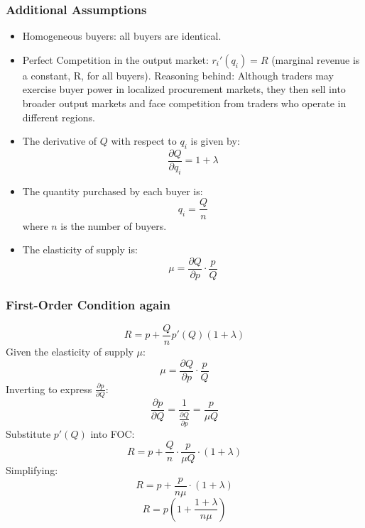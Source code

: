 \documentclass[12pt]{article}
\begin{document}
\subsubsection{Additional Assumptions}
\begin{itemize}
  \item Homogeneous buyers: all buyers are identical.
  \item Perfect Competition in the output market: \( r_i'(q_i) = R \) (marginal revenue is a constant, R, for all buyers). Reasoning behind: Although traders may exercise buyer power in localized procurement markets, they then sell into broader output markets and face competition from traders who operate in different regions.
  \item The derivative of \( Q \) with respect to \( q_i \) is given by:
    \begin{equation}
    \frac{\partial Q}{\partial q_i} = 1 + \lambda
    \end{equation}
  \item The quantity purchased by each buyer is:
    \begin{equation}
    q_i = \frac{Q}{n}
    \end{equation}
    where \( n \) is the number of buyers.
  \item The elasticity of supply is:
    \begin{equation}
    \mu = \frac{\partial Q}{\partial p} \cdot \frac{p}{Q}
    \end{equation}
\end{itemize}

\subsubsection{First-Order Condition again}
\begin{equation}
R = p + \frac{Q}{n} p'(Q) (1 + \lambda)
\end{equation}
Given the elasticity of supply \(\mu\):
\begin{equation}
\mu = \frac{\partial Q}{\partial p} \cdot \frac{p}{Q}
\end{equation}
Inverting to express \(\frac{\partial p}{\partial Q}\):
\begin{equation}
\frac{\partial p}{\partial Q} = \frac{1}{\frac{\partial Q}{\partial p}} = \frac{p}{\mu Q}
\end{equation}
Substitute \( p'(Q) \) into FOC:
\begin{equation}
R = p + \frac{Q}{n} \cdot \frac{p}{\mu Q} \cdot (1 + \lambda)
\end{equation}
Simplifying:
\begin{equation}
R = p + \frac{p}{n \mu} \cdot (1 + \lambda)
\end{equation}
\begin{equation}
R = p \left(1 + \frac{1 + \lambda}{n \mu}\right)
\end{equation}
\end{document}
